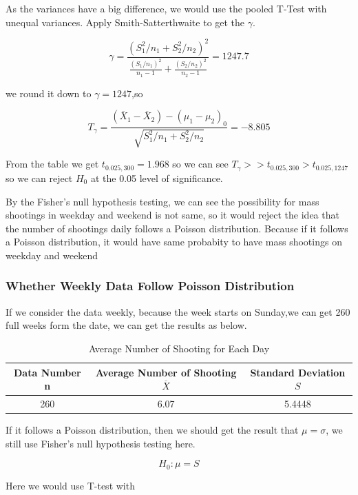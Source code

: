 \documentclass{article}
\begin{document}
As the variances have a big difference, we would use the pooled T-Test with unequal variances. Apply  Smith-Satterthwaite to get the $\gamma$.

$$\gamma=\frac{(S_1^2/n_1+S_2^2/n_2)^2}{\frac{(S_1/n_1)^2}{n_1-1}+\frac{(S_2/n_2)^2}{n_2-1}}=1247.7$$

we round it down to $\gamma=1247$,so

$$T_\gamma=\frac{(\overline X_1-\overline X_2)-(\mu_1-\mu_2)_0}{\sqrt{S_1^2/n_1+S_2^2/n_2}}=-8.805$$

From the table we get $t_{0.025,300}=1.968$ so we can see $T_\gamma >>t_{0.025,300}>t_{0.025,1247}$ so we can reject $H_0$ at the 0.05 level of significance.

By the Fisher’s null hypothesis testing, we can see the possibility for mass shootings in weekday and weekend is not same, so it would reject the idea that the number of shootings daily follows a Poisson distribution. Because if it follows a Poisson distribution, it would have same probabity to have mass shootings on weekday and weekend



\subsubsection{Whether  Weekly Data Follow Poisson Distribution}


If we consider the data weekly, because the week starts on Sunday,we can get 260 full weeks form the date, we can get the results as below.

\begin{table} [!htbp]
\begin{center}
\begin{tabular*} {14cm} {@{\extracolsep{\fill} }ccc} 
\toprule
Data Number n &Average Number of Shooting $\overline X$ & Standard Deviation $S$\\
\midrule
260 & 6.07	& 5.4448\\
\bottomrule
\end{tabular*} 
\end{center}
\caption{Average Number of Shooting for Each Day }
\end{table} 

If it follows a Poisson distribution, then we should get the result that $\mu=\sigma$, we still use Fisher’s null hypothesis testing here.

$$H_0:\mu=S$$

Here we would use T-test with
\end{document}
